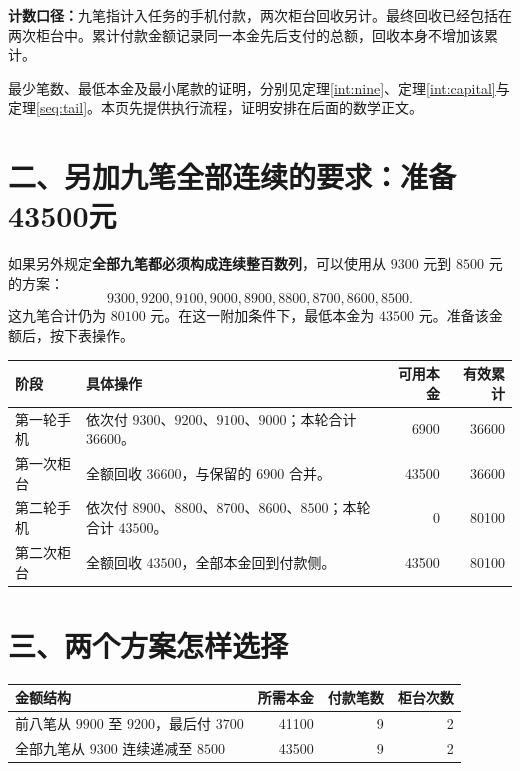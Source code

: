 \documentclass[UTF8,a4paper]{ctexbook}
\theoremstyle{definition}
\numberwithin{equation}{chapter}
\newcommand{\1}{\mathbf{1}}
\begin{document}
\noindent\textbf{计数口径：}九笔指计入任务的手机付款，两次柜台回收另计。最终回收已经包括在两次柜台中。累计付款金额记录同一本金先后支付的总额，回收本身不增加该累计。

最少笔数、最低本金及最小尾款的证明，分别见定理\ref{int:nine}、定理\ref{int:capital}与定理\ref{seq:tail}。本页先提供执行流程，证明安排在后面的数学正文。

\clearpage
\section*{二、另加九笔全部连续的要求：准备43500元}

如果另外规定\textbf{全部九笔都必须构成连续整百数列}，可以使用从 $9300$ 元到 $8500$ 元的方案：
\[
9300,9200,9100,9000,8900,8800,8700,8600,8500.
\]
这九笔合计仍为 $80100$ 元。在这一附加条件下，最低本金为 $43500$ 元。准备该金额后，按下表操作。

\begingroup
\renewcommand{\arraystretch}{1.35}
\begin{center}
\begin{tabularx}{\textwidth}{@{}p{21mm}Xrr@{}}
\toprule
阶段 & 具体操作 & 可用本金 & 有效累计\\
\midrule
第一轮手机 & 依次付 $9300$、$9200$、$9100$、$9000$；本轮合计 $36600$。 & 6900 & 36600\\
第一次柜台 & 全额回收 $36600$，与保留的 $6900$ 合并。 & 43500 & 36600\\
第二轮手机 & 依次付 $8900$、$8800$、$8700$、$8600$、$8500$；本轮合计 $43500$。 & 0 & 80100\\
第二次柜台 & 全额回收 $43500$，全部本金回到付款侧。 & 43500 & 80100\\
\bottomrule
\end{tabularx}
\end{center}
\endgroup

\section*{三、两个方案怎样选择}

\begingroup
\renewcommand{\arraystretch}{1.3}
\begin{center}
\begin{tabularx}{\textwidth}{@{}Xrrr@{}}
\toprule
金额结构 & 所需本金 & 付款笔数 & 柜台次数\\
\midrule
前八笔从 $9900$ 至 $9200$，最后付 $3700$ & 41100 & 9 & 2\\
全部九笔从 $9300$ 连续递减至 $8500$ & 43500 & 9 & 2\\
\bottomrule
\end{tabularx}
\end{center}
\endgroup
\end{document}
